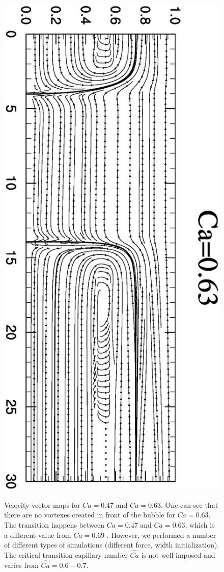 \documentclass[preprint,12pt]{elsarticle}
\begin{document}
\begin{figure}[ht]
\includegraphics[angle=90,width=\textwidth]{Figures/stream_ca63.eps}\\
\caption{Velocity vector maps for $Ca=0.47$ and $Ca=0.63$. One can see that there are no vortexes
created
in front of the bubble for $Ca=0.63$. The transition happens between $Ca=0.47$ and $Ca=0.63$, which
is a different value from $Ca=0.69$ \cite{heil-threedim}. However, we performed a number of
different types of simulations (different force, width initialization). The critical transition
capillary number $\widehat{Ca}$ is not well imposed and varies from $\widehat{Ca}=0.6-0.7$.
\label{fig:streamlines:pattern}}
\end{figure}
\end{document}
